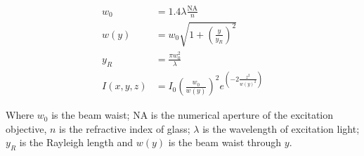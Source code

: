 \begin{align}
  w_0 &= 1.4 \lambda \frac{ \text{NA}}{n}\\
  w(y) &= w_0 \sqrt{1+\left(\frac{y}{y_R}\right)^2}\\
  y_R &= \frac{\pi w_0^2}{\lambda}\\
  I(x,y,z) &= I_0 \left(\frac{w_0}{w(y)}\right)^2 e^{\left(-2\frac{z^2}{w(y)^2}\right)}
\end{align}

Where \(w_0\) is the beam waist; NA is the numerical aperture of the excitation objective, $n$ is the refractive index of glass; \(\lambda\) is the wavelength of excitation light; \(y_R\) is the Rayleigh length and \(w(y)\) is the beam waist through $y$.


